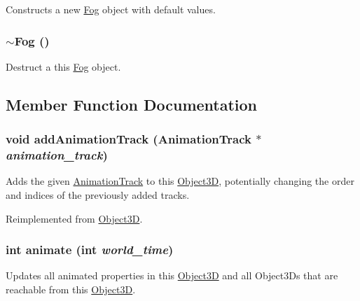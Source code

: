 Constructs a new \hyperlink{classm3g_1_1Fog}{Fog} object with default values. \hypertarget{classm3g_1_1Fog_c13d77e65284ed8f7480c8f83ed9780f}{
\subsubsection[{$\sim$Fog}]{\setlength{\rightskip}{0pt plus 5cm}$\sim${\bf Fog} ()}}
\label{classm3g_1_1Fog_c13d77e65284ed8f7480c8f83ed9780f}


Destruct a this \hyperlink{classm3g_1_1Fog}{Fog} object. 

\subsection{Member Function Documentation}
\hypertarget{classm3g_1_1Fog_415c0b110f95410ded9b85e5d99a496b}{
\subsubsection[{addAnimationTrack}]{\setlength{\rightskip}{0pt plus 5cm}void addAnimationTrack ({\bf AnimationTrack} $\ast$ {\em animation\_\-track})}}
\label{classm3g_1_1Fog_415c0b110f95410ded9b85e5d99a496b}


Adds the given \hyperlink{classm3g_1_1AnimationTrack}{AnimationTrack} to this \hyperlink{classm3g_1_1Object3D}{Object3D}, potentially changing the order and indices of the previously added tracks. 

Reimplemented from \hyperlink{classm3g_1_1Object3D_415c0b110f95410ded9b85e5d99a496b}{Object3D}.\hypertarget{classm3g_1_1Fog_8aad1ceab4c2a03609c8a42324ce484d}{
\subsubsection[{animate}]{\setlength{\rightskip}{0pt plus 5cm}int animate (int {\em world\_\-time})}}
\label{classm3g_1_1Fog_8aad1ceab4c2a03609c8a42324ce484d}


Updates all animated properties in this \hyperlink{classm3g_1_1Object3D}{Object3D} and all Object3Ds that are reachable from this \hyperlink{classm3g_1_1Object3D}{Object3D}. 

